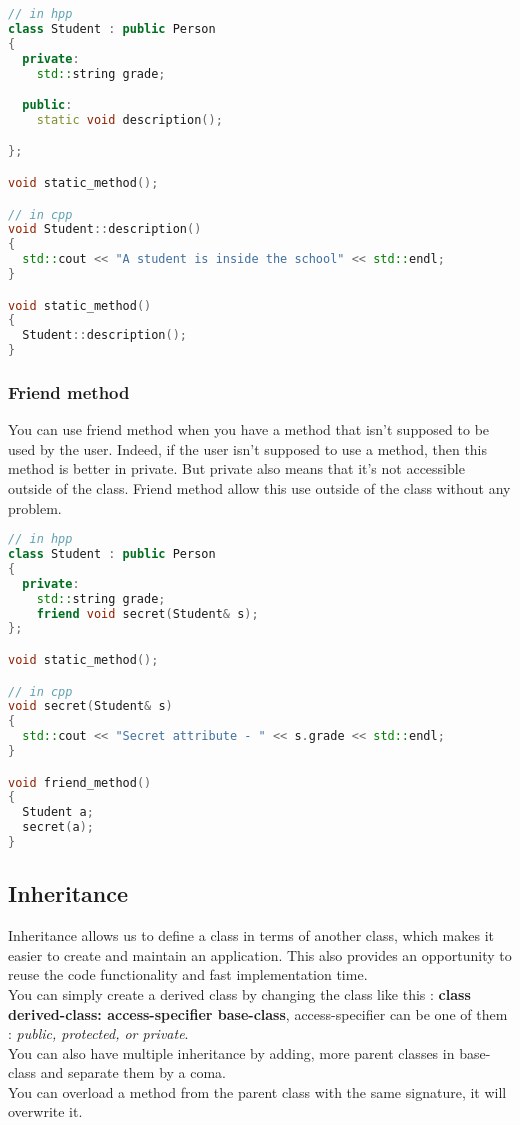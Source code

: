 \documentclass[a4paper, 12pt, titlepage]{scrartcl} %
\begin{document}
\begin{lstlisting}[language=C++]
// in hpp
class Student : public Person
{
  private:
    std::string grade;

  public:
    static void description();

};

void static_method();

// in cpp
void Student::description()
{
  std::cout << "A student is inside the school" << std::endl;
}

void static_method()
{
  Student::description();
}
\end{lstlisting} \vspace{5mm}

\subsubsection{Friend method}
You can use friend method when you have a method that isn't supposed to be used by the user. Indeed, if the user isn't supposed to use a method, then this method is better in private. But private also means that it's not accessible outside of the class. Friend method allow this use outside of the class without any problem. 

\begin{lstlisting}[language=C++]
// in hpp
class Student : public Person
{
  private:
    std::string grade;
    friend void secret(Student& s);
};

void static_method();

// in cpp
void secret(Student& s)
{
  std::cout << "Secret attribute - " << s.grade << std::endl;
}

void friend_method()
{
  Student a;
  secret(a);
}
\end{lstlisting} \vspace{5mm}

\subsection{Inheritance}
Inheritance allows us to define a class in terms of another class, which makes it easier to create and maintain an application. This also provides an opportunity to reuse the code functionality and fast implementation time. \\ You can simply create a derived class by changing the class like this : \textbf{class derived-class: access-specifier base-class}, access-specifier can be one of them : \textit{public, protected, or private}. \\ You can also have multiple inheritance by adding, more parent classes in base-class and separate them by a coma. \\ You can overload a method from the parent class with the same signature, it will overwrite it.
\end{document}
